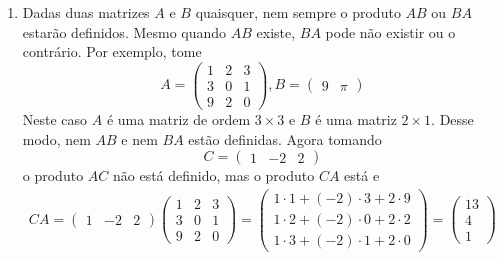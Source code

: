 \begin{observacoes}
    \begin{enumerate}[label={\arabic*})]
        \item Dadas duas matrizes $A$ e $B$ quaisquer, nem sempre o produto $AB$ ou $BA$ estarão definidos. Mesmo quando $AB$ existe, $BA$
            pode não existir ou o contrário. Por exemplo, tome
            \[
                A = \begin{pmatrix}
                    1 & 2 & 3\\
                    3 & 0 & 1\\
                    9 & 2 & 0
                \end{pmatrix},
                B = \begin{pmatrix}
                    9 & \pi
                \end{pmatrix}
            \]
            Neste caso $A$ é uma matriz de ordem $3\times 3$ e $B$ é uma matriz $2 \times 1$. Desse modo, nem $AB$ e nem $BA$ estão
            definidas.
            Agora tomando
            \[
                C = \begin{pmatrix}
                    1 & -2 & 2
                \end{pmatrix}
            \]
            o produto $AC$ não está definido, mas o produto $CA$ está e
            \begin{align*}
                CA = \begin{pmatrix}
                    1 & -2 & 2
                \end{pmatrix}
                \begin{pmatrix}
                    1 & 2 & 3\\
                    3 & 0 & 1\\
                    9 & 2 & 0
                    \end{pmatrix} = \begin{pmatrix}
                    1\cdot 1 + (-2)\cdot 3 + 2\cdot 9\\
                    1\cdot 2 + (-2)\cdot 0 + 2\cdot 2\\
                    1\cdot 3 + (-2)\cdot 1 + 2\cdot 0
                \end{pmatrix}
                = \begin{pmatrix}
                    13\\
                    4\\
                    1
                \end{pmatrix}
            \end{align*}


\end{enumerate}
\end{observacoes}
